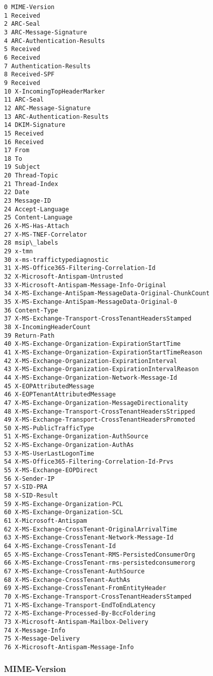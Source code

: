 \documentclass[11pt]{article}
\begin{document}
    \begin{Verbatim}[commandchars=\\\{\}]
0 MIME-Version
1 Received
2 ARC-Seal
3 ARC-Message-Signature
4 ARC-Authentication-Results
5 Received
6 Received
7 Authentication-Results
8 Received-SPF
9 Received
10 X-IncomingTopHeaderMarker
11 ARC-Seal
12 ARC-Message-Signature
13 ARC-Authentication-Results
14 DKIM-Signature
15 Received
16 Received
17 From
18 To
19 Subject
20 Thread-Topic
21 Thread-Index
22 Date
23 Message-ID
24 Accept-Language
25 Content-Language
26 X-MS-Has-Attach
27 X-MS-TNEF-Correlator
28 msip\_labels
29 x-tmn
30 x-ms-traffictypediagnostic
31 X-MS-Office365-Filtering-Correlation-Id
32 X-Microsoft-Antispam-Untrusted
33 X-Microsoft-Antispam-Message-Info-Original
34 X-MS-Exchange-AntiSpam-MessageData-Original-ChunkCount
35 X-MS-Exchange-AntiSpam-MessageData-Original-0
36 Content-Type
37 X-MS-Exchange-Transport-CrossTenantHeadersStamped
38 X-IncomingHeaderCount
39 Return-Path
40 X-MS-Exchange-Organization-ExpirationStartTime
41 X-MS-Exchange-Organization-ExpirationStartTimeReason
42 X-MS-Exchange-Organization-ExpirationInterval
43 X-MS-Exchange-Organization-ExpirationIntervalReason
44 X-MS-Exchange-Organization-Network-Message-Id
45 X-EOPAttributedMessage
46 X-EOPTenantAttributedMessage
47 X-MS-Exchange-Organization-MessageDirectionality
48 X-MS-Exchange-Transport-CrossTenantHeadersStripped
49 X-MS-Exchange-Transport-CrossTenantHeadersPromoted
50 X-MS-PublicTrafficType
51 X-MS-Exchange-Organization-AuthSource
52 X-MS-Exchange-Organization-AuthAs
53 X-MS-UserLastLogonTime
54 X-MS-Office365-Filtering-Correlation-Id-Prvs
55 X-MS-Exchange-EOPDirect
56 X-Sender-IP
57 X-SID-PRA
58 X-SID-Result
59 X-MS-Exchange-Organization-PCL
60 X-MS-Exchange-Organization-SCL
61 X-Microsoft-Antispam
62 X-MS-Exchange-CrossTenant-OriginalArrivalTime
63 X-MS-Exchange-CrossTenant-Network-Message-Id
64 X-MS-Exchange-CrossTenant-Id
65 X-MS-Exchange-CrossTenant-RMS-PersistedConsumerOrg
66 X-MS-Exchange-CrossTenant-rms-persistedconsumerorg
67 X-MS-Exchange-CrossTenant-AuthSource
68 X-MS-Exchange-CrossTenant-AuthAs
69 X-MS-Exchange-CrossTenant-FromEntityHeader
70 X-MS-Exchange-Transport-CrossTenantHeadersStamped
71 X-MS-Exchange-Transport-EndToEndLatency
72 X-MS-Exchange-Processed-By-BccFoldering
73 X-Microsoft-Antispam-Mailbox-Delivery
74 X-Message-Info
75 X-Message-Delivery
76 X-Microsoft-Antispam-Message-Info
    \end{Verbatim}

    \hypertarget{mime-version}{%
\subsubsection{MIME-Version}\label{mime-version}}
\end{document}
